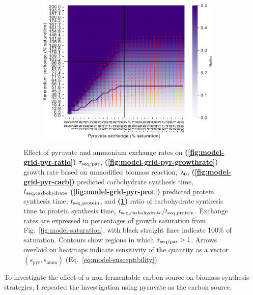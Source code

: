 \begin{figure}
  \begin{subfigure}[t]{0.45\textwidth}
  \centering
    \includegraphics[width=\linewidth]{ec_grid_pyr_amm_carb_to_prot}
    \caption{
    }
    \label{fig:model-grid-pyr-carb-to-prot}
  \end{subfigure}
  \caption[
    Effect of pyruvate and ammonium exchange rates
  ]{
    Effect of pyruvate and ammonium exchange rates on \textbf{(\ref{fig:model-grid-pyr-ratio})} $\tau_{\mathrm{seq}/\mathrm{par}}$, \textbf{(\ref{fig:model-grid-pyr-growthrate})} growth rate based on unmodified biomass reaction, $\lambda_{0}$, \textbf{(\ref{fig:model-grid-pyr-carb})} predicted carbohydrate synthesis time, $t_{\mathrm{seq},\mathrm{carbohydrate}}$ \textbf{(\ref{fig:model-grid-pyr-prot})} predicted protein synthesis time, $t_{\mathrm{seq},\mathrm{protein}}$, and \textbf{(\ref{fig:model-grid-pyr-carb-to-prot})} ratio of carbohydrate synthesis time to protein synthesis time, $t_{\mathrm{seq},\mathrm{carbohydrate}}/t_{\mathrm{seq},\mathrm{protein}}$.
    Exchange rates are expressed in percentages of growth saturation from Fig.\ \ref{fig:model-saturation}, with black straight lines indicate 100\% of saturation.
    Contours show regions in which $\tau_{\mathrm{seq}/\mathrm{par}} > 1$.
    Arrows overlaid on heatmaps indicate sensitivity of the quantity as a vector $(s_{\mathrm{pyr}}, s_{\mathrm{amm}})$ (Eq.\ \ref{eq:model-susceptibility}).
  }
  \label{fig:model-grid-pyr}
\end{figure}

To investigate the effect of a non-fermentable carbon source on biomass synthesis strategies, I repeated the investigation using pyruvate as the carbon source. %

